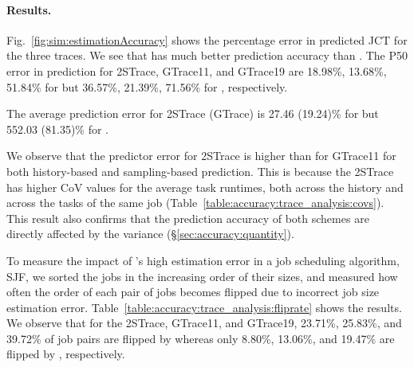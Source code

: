 {\paragraph{Results.}
Fig.~\ref{fig:sim:estimationAccuracy} shows the percentage error in predicted JCT for 
  the three traces.
{We see that \slearn has much better prediction accuracy than
  \primarybasepredict.} The P50 error in prediction for 2STrace,
GTrace11, and GTrace19 are 18.98\%, 13.68\%, 51.84\% for \namepredict
but 36.57\%, 21.39\%, 71.56\% for \primarybasepredict, respectively.

\fi

{The average prediction error for 2STrace (GTrace) is 27.46 (19.24)\% for \namepredict
but 552.03 (81.35)\%} for \primarybasepredict.
\fi


We observe that the predictor error for 2STrace is higher than for
GTrace11
for both history-based and sampling-based prediction.  This is because
the 2STrace has higher CoV values for the average task runtimes, both
across the history and across the tasks of the same job
(Table~\ref{table:accuracy:trace_analysis:covs}). This result also
confirms that the prediction accuracy of both schemes are directly
affected by the variance (\S\ref{sec:accuracy:quantity}).

{To measure the impact of \primarybasepredict's high estimation error in
a job scheduling algorithm, \eg SJF, 
we sorted the jobs in the increasing order of their sizes, and measured how often
the order of each pair of jobs becomes flipped due to incorrect job size
estimation error.  Table~\ref{table:accuracy:trace_analysis:fliprate} shows the
results.  We observe that for the 2STrace, GTrace11, and GTrace19, 23.71\%,
25.83\%, and 39.72\% of job pairs are flipped by \primarybasepredict whereas
only 8.80\%, 13.06\%, and 19.47\% are flipped by \name, respectively.

}}
